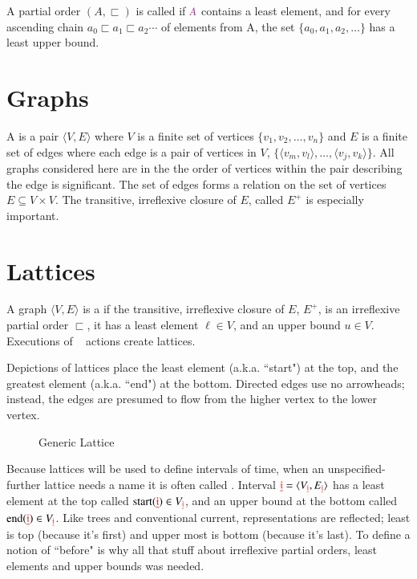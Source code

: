 \pn A partial order $(A, \sqsubset)$ is called  if $\mc{A}$ contains a least element, and 
for every ascending chain
\(a_0 \sqsubset a_1 \sqsubset a_2 \cdots\)
of elements from A, the set
\(\{a_0,a_1,a_2,\ldots\}\)
has a least upper bound.

\section{Graphs}\label{sec:graphs}

\pn A  is a pair $\langle V,E\rangle$ where $V$ is a finite set of vertices
\(\{v_1,v_2,\ldots,v_n\}\)
and $E$ is a finite set of edges where each edge is a pair of vertices in $V$,
\(\{\langle v_m,v_l\rangle,\ldots,\langle v_j,v_k\rangle\}\).  
All graphs considered here are  in the the order of vertices within the pair
describing the edge is significant.  
The set of edges forms a relation on the set of vertices
\(E\subseteq V\times V\).  
The transitive, irreflexive closure of $E$, called $E^{+}$ is especially important.

\section{Lattices}\label{sec:lattices}

\pn A graph $\langle V,E\rangle$ is a  if the transitive, irreflexive closure of $E$, $E^{+}$,
is an irreflexive partial order $\sqsubset$, it has a least element $\ell\in V$, and an upper
bound $u\in V$.  Executions of \lang~ actions create lattices. 

\pn Depictions of lattices place the least element (a.k.a. ``start") at the top, and the greatest element (a.k.a. ``end") at the bottom.
Directed edges use no arrowheads; instead, the edges are presumed to flow from the higher vertex to the lower vertex.

\setlength{\unitlength}{0.6pt}
\renewcommand{\nodetextscalefactor}{1} %

\begin{figure}
\caption{Generic Lattice}
\label{fig:genlattice}
\end{figure}

\pn Because lattices will be used to define intervals of time, when an unspecified-further lattice needs a name it is often called .  Interval 
\( {\color{red}\underline{\mathbf{\mathfrak{i}}}}=\langle V_{ {\color{red}\underline{\mathbf{\mathfrak{i}}}}},E_{ {\color{red}\underline{\mathbf{\mathfrak{i}}}}}\rangle\)
has a least element at the top called \($start$(\interval{i})\in V_{\interval{i}}\), and an upper bound at the bottom called \($end$(\interval{i})\in V_{\interval{i}}\).  Like trees and conventional current, representations are reflected; least is top (because it's first) and upper most is bottom (because it's last).  To define a notion of ``before" is why all that stuff about irreflexive partial orders, least elements and upper bounds was needed.  


